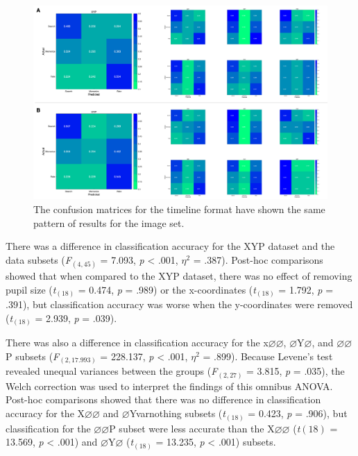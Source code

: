 \documentclass[
  english,
  man,floatsintext]{apa6}
\begin{document}
\begin{figure}
\centering
\includegraphics{images/img_conf_matrices.png}
\caption{\label{fig:img-conf-matrices}The confusion matrices for the timeline format have shown the same pattern of results for the image set.}
\end{figure}

There was a difference in classification accuracy for the XYP dataset and the data subsets (\emph{F}\(_{(4, 45)}\) = 7.093, \emph{p} \textless{} .001, \textit{$\eta$}\(^{2}\) = .387). Post-hoc comparisons showed that when compared to the XYP dataset, there was no effect of removing pupil size (\emph{t}\(_{(18)}\) = 0.474, \emph{p} = .989) or the x-coordinates (\emph{t}\(_{(18)}\) = 1.792, \emph{p} = .391), but classification accuracy was worse when the y-coordinates were removed (\emph{t}\(_{(18)}\) = 2.939, \emph{p} = .039).

There was also a difference in classification accuracy for the x\(\varnothing\varnothing\), \(\varnothing\)Y\(\varnothing\), and \(\varnothing\varnothing\)P subsets (\emph{F}\(_{(2, 17.993)}\) = 228.137, \emph{p} \textless{} .001, \textit{$\eta$}\(^{2}\) = .899). Because Levene's test revealed unequal variances between the groups (\emph{F}\(_{(2, 27)}\) = 3.815, \emph{p} = .035), the Welch correction was used to interpret the findings of this omnibus ANOVA. Post-hoc comparisons showed that there was no difference in classification accuracy for the X\(\varnothing\varnothing\) and \(\varnothing\)Yvarnothing subsets (\emph{t}\(_{(18)}\) = 0.423, \emph{p} = .906), but classification for the \(\varnothing\varnothing\)P subset were less accurate than the X\(\varnothing\varnothing\) (\emph{t}\({(18)}\) = 13.569, \emph{p} \textless{} .001) and \(\varnothing\)Y\(\varnothing\) (\emph{t}\(_{(18)}\) = 13.235, \emph{p} \textless{} .001) subsets.
\end{document}
